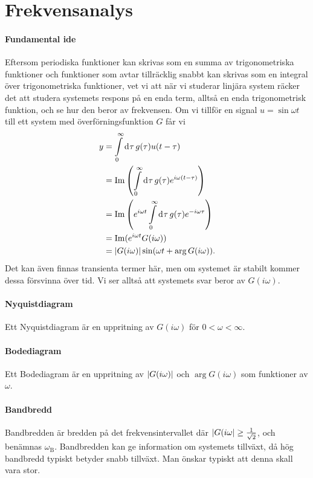 \section{Frekvensanalys}

\paragraph{Fundamental ide}
Eftersom periodiska funktioner kan skrivas som en summa av trigonometriska funktioner och funktioner som avtar tillräcklig snabbt kan skrivas som en integral över trigonometriska funktioner, vet vi att när vi studerar linjära system räcker det att studera systemets respons på en enda term, alltså en enda trigonometrisk funktion, och se hur den beror av frekvensen. Om vi tillför en signal $u = \sin{\omega t}$ till ett system med överförningsfunktion $G$ får vi
\begin{align*}
	y &= \int\limits_{0}^{\infty}\dd[]{\tau}g(\tau)u(t - \tau) \\
	  &= \Im\left(\int\limits_{0}^{\infty}\dd[]{\tau}g(\tau)e^{i\omega(t - \tau)}\right) \\
	  &= \Im\left(e^{i\omega t}\int\limits_{0}^{\infty}\dd[]{\tau}g(\tau)e^{-i\omega\tau}\right) \\
	  &= \Im(e^{i\omega t}G(i\omega)) \\
	  &= \abs{G(i\omega)}\sin(\omega t + \arg{G(i\omega)}).
\end{align*}
Det kan även finnas transienta termer här, men om systemet är stabilt kommer dessa försvinna över tid. Vi ser alltså att systemets svar beror av $G(i\omega)$.

\paragraph{Nyquistdiagram}
Ett Nyquistdiagram är en uppritning av $G(i\omega)$ för $0 < \omega < \infty$.

\paragraph{Bodediagram}
Ett Bodediagram är en uppritning av $\abs{G(i\omega)}$ och $\arg{G(i\omega)}$ som funktioner av $\omega$.

\paragraph{Bandbredd}
Bandbredden är bredden på det frekvensintervallet där $\abs{G(i\omega} \geq \frac{1}{\sqrt{2}}$, och benämnas $\omega_{\text{B}}$. Bandbredden kan ge information om systemets tillväxt, då hög bandbredd typiskt betyder snabb tillväxt. Man önskar typiskt att denna skall vara stor.

